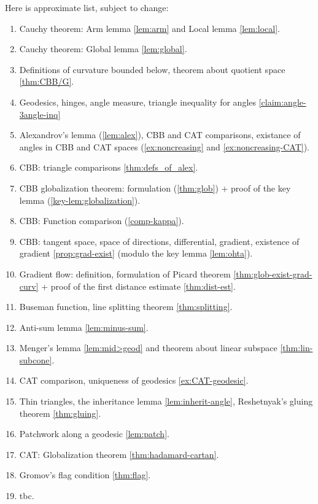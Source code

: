Here is approximate list, subject to change:
\begin{enumerate}
\item Cauchy theorem: Arm lemma \ref{lem:arm} and Local lemma \ref{lem:local}.
\item Cauchy theorem: Global lemma \ref{lem:global}.
\item Definitions of curvature bounded below, theorem about quotient space \ref{thm:CBB/G}.
\item Geodesics, hinges, angle measure, triangle inequality for angles \ref{claim:angle-3angle-inq}
\item Alexandrov's lemma (\ref{lem:alex}), CBB and CAT comparisons,
existance of angles in CBB and CAT spaces (\ref{ex:noncreasing} and \ref{ex:noncreasing-CAT}).
\item CBB: triangle comparisons \ref{thm:defs_of_alex}.
\item CBB globalization theorem: formulation (\ref{thm:glob})  + proof of the key lemma (\ref{key-lem:globalization}). 
\item CBB: Function comparison (\ref{comp-kappa}).
\item CBB: tangent space, space of directions, differential, gradient, existence of gradient \ref{prop:grad-exist} (modulo the key lemma \ref{lem:ohta}).
\item Gradient flow: definition, formulation of Picard theorem \ref{thm:glob-exist-grad-curv} + proof of the first distance estimate \ref{thm:dist-est}.
\item Buseman function, line splitting theorem \ref{thm:splitting}.
\item Anti-sum lemma \ref{lem:minus-sum}.
\item Menger’s lemma \ref{lem:mid>geod} and theorem about linear subspace \ref{thm:lin-subcone}.
\item CAT comparison, uniqueness of geodesics \ref{ex:CAT-geodesic}.
\item Thin triangles, the inheritance lemma \ref{lem:inherit-angle}, Reshetnyak's gluing theorem \ref{thm:gluing}.
\item Patchwork along a geodesic \ref{lem:patch}.
\item CAT: Globalization theorem \ref{thm:hadamard-cartan}.
\item Gromov's flag condition \ref{thm:flag}.
\item tbc.
\end{enumerate}


